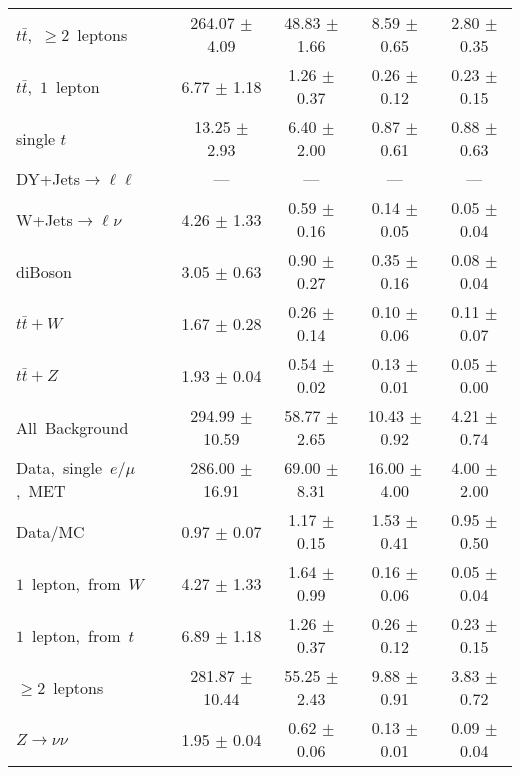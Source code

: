\documentclass{article}
\begin{document}
\begin{longtable}{|l|c|c|c|c|}
$t\bar{t}$,~$\ge2$~leptons & 264.07 $\pm$ 4.09  & 48.83 $\pm$ 1.66  & 8.59 $\pm$ 0.65  & 2.80 $\pm$ 0.35 \\* 
$t\bar{t}$,~$1$~lepton & 6.77 $\pm$ 1.18  & 1.26 $\pm$ 0.37  & 0.26 $\pm$ 0.12  & 0.23 $\pm$ 0.15 \\* 
single $t$  & 13.25 $\pm$ 2.93  & 6.40 $\pm$ 2.00  & 0.87 $\pm$ 0.61  & 0.88 $\pm$ 0.63 \\* 
DY+Jets$\rightarrow\ell\ell$  & ---  & ---  & ---  & --- \\* 
W+Jets$\rightarrow\ell\nu$  & 4.26 $\pm$ 1.33  & 0.59 $\pm$ 0.16  & 0.14 $\pm$ 0.05  & 0.05 $\pm$ 0.04 \\* 
diBoson  & 3.05 $\pm$ 0.63  & 0.90 $\pm$ 0.27  & 0.35 $\pm$ 0.16  & 0.08 $\pm$ 0.04 \\* 
$t\bar{t}+W$  & 1.67 $\pm$ 0.28  & 0.26 $\pm$ 0.14  & 0.10 $\pm$ 0.06  & 0.11 $\pm$ 0.07 \\* 
$t\bar{t}+Z$  & 1.93 $\pm$ 0.04  & 0.54 $\pm$ 0.02  & 0.13 $\pm$ 0.01  & 0.05 $\pm$ 0.00 \\* 
\hline \hline 
All~Background  & 294.99 $\pm$ 10.59  & 58.77 $\pm$ 2.65  & 10.43 $\pm$ 0.92  & 4.21 $\pm$ 0.74 \\* 
Data,~single~$e/\mu$,~MET  & 286.00 $\pm$ 16.91  & 69.00 $\pm$ 8.31  & 16.00 $\pm$ 4.00  & 4.00 $\pm$ 2.00 \\* 
Data/MC  & 0.97 $\pm$ 0.07  & 1.17 $\pm$ 0.15  & 1.53 $\pm$ 0.41  & 0.95 $\pm$ 0.50 \\* 
\hline \hline 
$1$~lepton,~from~$W$  & 4.27 $\pm$ 1.33  & 1.64 $\pm$ 0.99  & 0.16 $\pm$ 0.06  & 0.05 $\pm$ 0.04 \\* 
$1$~lepton,~from~$t$  & 6.89 $\pm$ 1.18  & 1.26 $\pm$ 0.37  & 0.26 $\pm$ 0.12  & 0.23 $\pm$ 0.15 \\* 
$\ge2$~leptons  & 281.87 $\pm$ 10.44  & 55.25 $\pm$ 2.43  & 9.88 $\pm$ 0.91  & 3.83 $\pm$ 0.72 \\* 
$Z\rightarrow\nu\nu$  & 1.95 $\pm$ 0.04  & 0.62 $\pm$ 0.06  & 0.13 $\pm$ 0.01  & 0.09 $\pm$ 0.04 \\* 
\hline 
\end{longtable} 

 
 
 
 
\pagebreak 

 
 
 
 
\end{document}
